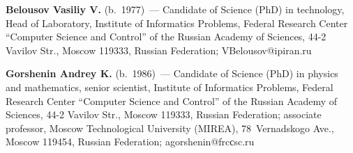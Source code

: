 \noindent
\textbf{Belousov Vasiliy V.} (b.\ 1977)~---
Candidate of Science (PhD) in technology, Head of Laboratory, 
Institute of Informatics Problems, Federal Research Center ``Computer Science and 
Control'' of the Russian Academy of Sciences, 44-2 Vavilov Str., Moscow 119333, 
Russian Federation; VBelousov@ipiran.ru 

\vspace*{3pt}

\noindent
\textbf{Gorshenin Andrey K.}  (b.\ 1986)~---
Candidate of Science (PhD) in physics and mathematics, senior scientist, 
Institute of Informatics Problems, Federal Research Center ``Computer Science and Control'' 
of the Russian Academy of Sciences, 44-2 Vavilov Str., Moscow 119333, 
Russian Federation; associate professor, %
Moscow Technological University (MIREA), 
78~Vernadskogo Ave., Moscow 119454, Russian Federation;
 agorshenin@frcсsc.ru

\label{end\stat}


\renewcommand{\bibname}{\protect\rm Литература}